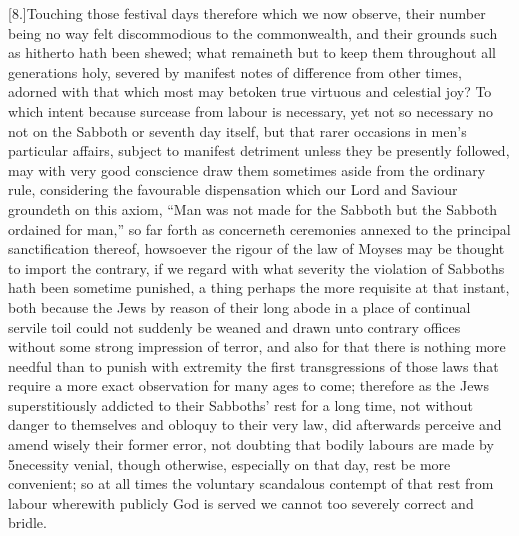 [8.]Touching those festival days therefore which we now observe, their number being no way felt discommodious to the commonwealth, and their grounds such as hitherto hath been shewed; what remaineth but to keep them throughout all generations holy, severed by manifest notes of difference from other times, adorned with that which most may betoken true virtuous and celestial joy? To which intent because surcease from labour is necessary, yet not so necessary no not on the Sabboth or seventh day itself, but that rarer occasions in men’s particular affairs, subject to manifest detriment unless they be presently followed, may with very good conscience draw them sometimes aside from the ordinary rule, considering the favourable dispensation which our Lord and Saviour  groundeth on this axiom,
 “Man was not made for the Sabboth but the Sabboth ordained for man,” so far forth as concerneth ceremonies annexed to the principal sanctification thereof, howsoever the rigour of the law of Moyses may be thought to import the contrary, if we regard with what severity the violation of Sabboths hath been sometime punished, a thing perhaps the more requisite at that instant, both because the Jews by reason of their long abode in a place of continual servile toil could not suddenly be weaned and drawn unto contrary offices without some strong impression of terror, and also for that there is nothing more needful than to punish with extremity the first transgressions of those laws that require a more exact observation for many ages to come; therefore as the Jews superstitiously addicted to their Sabboths’ rest for a long time, not without danger to themselves and obloquy to their very law, did afterwards perceive and amend wisely their former error, not doubting that bodily labours are made by 5necessity venial, though otherwise, especially on that day, rest be more convenient; so at all times the voluntary scandalous contempt of that rest from labour wherewith publicly God is served we cannot too severely correct and bridle.

